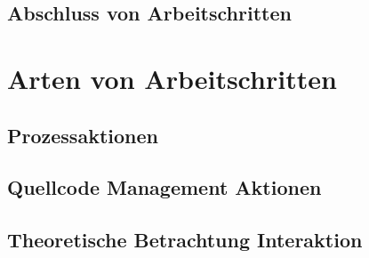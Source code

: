 \subsection{Abschluss von Arbeitschritten}


\section{Arten von Arbeitschritten}
\subsection{Prozessaktionen}
\subsection{Quellcode Management Aktionen}
\subsection{Theoretische Betrachtung Interaktion}
